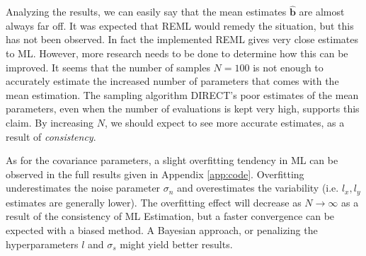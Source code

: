 Analyzing the results, we can easily say that the mean estimates $\mathbf{\hat{b}}$ are almost always far off. It was expected that REML would remedy the situation, but this has not been observed. In fact the implemented REML gives very close estimates to ML. However, more research needs to be done to determine how this can be improved. It seems that the number of samples $N = 100$ is not enough to accurately estimate the increased number of parameters that comes with the mean estimation. The sampling algorithm DIRECT's poor estimates of the mean parameters, even when the number of evaluations is kept very high, supports this claim. By increasing $N$, we should expect to see more accurate estimates, as a result of \emph{consistency}.

As for the covariance parameters, a slight overfitting tendency in ML can be observed in the full results given in Appendix \ref{app:code}. Overfitting underestimates the noise parameter $\sigma_n$ and overestimates the variability (i.e. $l_x, l_y$ estimates are generally lower). The overfitting effect will decrease as $N \to \infty$ as a result of the consistency of ML Estimation, but a faster convergence can be expected with a biased method. A Bayesian approach, or penalizing the hyperparameters $l$ and $\sigma_s$ might yield better results. 

\begin{table}[h!t]
\renewcommand{\arraystretch}{1.3}
\caption{Hyperparameter estimation results - test case 2}
\label{hp_estimation2}
\centering
{}
\end{table}

